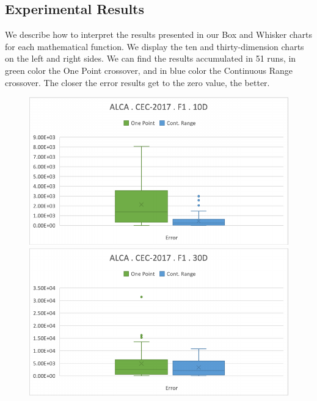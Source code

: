 \documentclass[graybox]{svmult}
\begin{document}
    \FloatBarrier


    \subsection{Experimental Results}

    We describe how to interpret the results presented in our Box and Whisker charts for each mathematical function. We display the ten and thirty-dimension charts on the left and right sides. We can find the results accumulated in 51 runs, in green color the One Point crossover, and in blue color the Continuous Range crossover. The closer the error results get to the zero value, the better.

    \begin{figure}[!ht]
        \begin{minipage}[h]{0.49\linewidth}
            \includegraphics[width=1\linewidth]{img/fig_experiment_F1x10D.pdf} 
        \end{minipage}
        \hfill
        \begin{minipage}[h]{0.49\linewidth}
            \includegraphics[width=1\linewidth]{img/fig_experiment_F1x30D.pdf} 

\end{minipage}
\end{figure}
\end{document}
